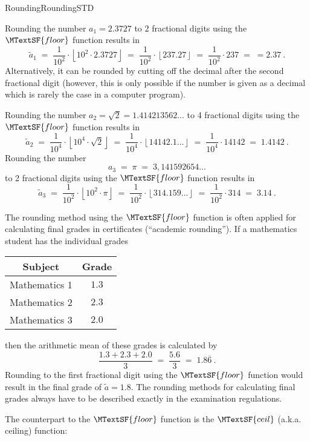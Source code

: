 \begin{MXContent}{Rounding}{Rounding}{STD}
\begin{MExample}
Rounding the number $a_1=2.3727$ to 2 fractional digits using the $\MTextSF{floor}$ function results in
$$
\tilde a_1 \;=\; \frac1{10^2}\cdot \left\lfloor{10^2\cdot2.3727}\right\rfloor\; =\; \frac1{10^2}\cdot \left\lfloor{ 237.27}\right\rfloor \;=\; \frac1{10^2}\cdot 237\;=\; =2.37\: .
$$
Alternatively, it can be rounded by cutting off the decimal after the second fractional digit 
(however, this is only possible if the number is given as a decimal which is rarely the case in a computer program).


Rounding the number $a_2=\sqrt{2}=1.414213562\ldots$ to 4 fractional digits using the $\MTextSF{floor}$ function results in
$$
\tilde a_2 \;=\; \frac1{10^4}\cdot \left\lfloor{ 10^4\cdot \sqrt2}\right\rfloor \;=\; \frac1{10^4}\cdot \left\lfloor{ 14142.1\ldots}\right\rfloor\;=\; \frac1{10^4}\cdot 14142 \;=\; 1.4142\: .
$$
Rounding the number
$$
a_3 \;=\; \pi \;=\; 3,141592654\ldots
$$
to 2 fractional digits using the $\MTextSF{floor}$ function results in
$$
\tilde a_3 \;=\; \frac1{10^2}\cdot \left\lfloor{ 10^2\cdot\pi}\right\rfloor\;=\; \frac1{10^2}\cdot \left\lfloor{ 314.159\ldots}\right\rfloor \;=\; \frac1{10^2}\cdot 314 \;=\; 3.14\: .
$$
\end{MExample}

The rounding method using the $\MTextSF{floor}$ function is often applied for calculating final grades in certificates 
(``academic rounding''). If a mathematics student has the individual grades
\begin{center}
\begin{tabular}{|c|c|}
\hline
Subject & Grade \\ \hline
Mathematics 1 & $1.3$ \\ 
Mathematics 2 & $2.3$ \\ 
Mathematics 3 & $2.0$ \\ \hline
\end{tabular}
\end{center}
then the arithmetic mean of these grades is calculated by 
$$
\frac{1.3 + 2.3 + 2.0}{3}\; =\; \frac{5.6}{3} \; =\; 1.8\overline{6}\: .
$$
Rounding to the first fractional digit using the $\MTextSF{floor}$ function would result in the final 
grade of $\tilde a=1.8$. The rounding methods for calculating final grades always have to be described exactly 
in the examination regulations.

The counterpart to the $\MTextSF{floor}$ function is the $\MTextSF{ceil}$ (a.k.a. ceiling) function:


\end{MXContent}
